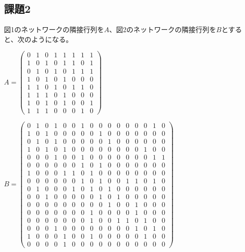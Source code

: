 \documentclass[12pt]{jarticle}
\begin{document}
\subsection{課題2}
図1のネットワークの隣接行列を$A$、図2のネットワークの隣接行列を$B$とすると、次のようになる。

\begin{center}
    \(
    A = \left(
    \begin{array}{cccccccc}
        0 & 1 & 0 & 1 & 1 & 1 & 1 & 1 \\
        1 & 0 & 1 & 0 & 1 & 1 & 0 & 1 \\
        0 & 1 & 0 & 1 & 0 & 1 & 1 & 1 \\
        1 & 0 & 1 & 0 & 1 & 0 & 0 & 0 \\
        1 & 1 & 0 & 1 & 0 & 1 & 1 & 0 \\
        1 & 1 & 1 & 0 & 1 & 0 & 0 & 0 \\
        1 & 0 & 1 & 0 & 1 & 0 & 0 & 1 \\
        1 & 1 & 1 & 0 & 0 & 0 & 1 & 0
    \end{array}
    \right)
    \)
\end{center}

\clearpage
\begin{center}
    \(
    B = \left(
    \begin{array}{cccccccccccccccc}
        0 & 1 & 0 & 1 & 0 & 0 & 1 & 0 & 0 & 0 & 0 & 0 & 0 & 0 & 1 & 0 \\
        1 & 0 & 1 & 0 & 0 & 0 & 0 & 0 & 1 & 0 & 0 & 0 & 0 & 0 & 0 & 0 \\
        0 & 1 & 0 & 1 & 0 & 0 & 0 & 0 & 0 & 1 & 0 & 0 & 0 & 0 & 0 & 0 \\
        1 & 0 & 1 & 0 & 1 & 0 & 0 & 0 & 0 & 0 & 0 & 0 & 0 & 1 & 0 & 0 \\
        0 & 0 & 0 & 1 & 0 & 0 & 1 & 0 & 0 & 0 & 0 & 0 & 0 & 0 & 1 & 1 \\
        0 & 0 & 0 & 0 & 0 & 0 & 1 & 0 & 1 & 0 & 0 & 0 & 0 & 0 & 0 & 0 \\
        1 & 0 & 0 & 0 & 1 & 1 & 0 & 1 & 0 & 0 & 0 & 0 & 0 & 0 & 0 & 0 \\
        0 & 0 & 0 & 0 & 0 & 0 & 1 & 0 & 1 & 0 & 0 & 1 & 1 & 0 & 1 & 0 \\
        0 & 1 & 0 & 0 & 0 & 1 & 0 & 1 & 0 & 1 & 0 & 0 & 0 & 0 & 0 & 0 \\
        0 & 0 & 1 & 0 & 0 & 0 & 0 & 0 & 1 & 0 & 1 & 0 & 0 & 0 & 0 & 0 \\
        0 & 0 & 0 & 0 & 0 & 0 & 0 & 0 & 0 & 1 & 0 & 0 & 1 & 0 & 0 & 0 \\
        0 & 0 & 0 & 0 & 0 & 0 & 0 & 1 & 0 & 0 & 0 & 0 & 1 & 0 & 0 & 0 \\
        0 & 0 & 0 & 0 & 0 & 0 & 0 & 1 & 0 & 0 & 1 & 1 & 0 & 1 & 0 & 0 \\
        0 & 0 & 0 & 1 & 0 & 0 & 0 & 0 & 0 & 0 & 0 & 0 & 1 & 0 & 1 & 0 \\
        1 & 0 & 0 & 0 & 1 & 0 & 0 & 1 & 0 & 0 & 0 & 0 & 0 & 1 & 0 & 0 \\
        0 & 0 & 0 & 0 & 1 & 0 & 0 & 0 & 0 & 0 & 0 & 0 & 0 & 0 & 0 & 0
    \end{array}
    \right)
    \)
\end{center}
\end{document}

